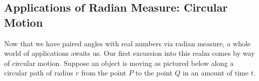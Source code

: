 \documentclass{ximera}
\begin{document}
\begin{example}
\begin{explanation}
\begin{enumerate}
\begin{image}

\end{image}

\end{enumerate}

\end{explanation}

\end{example}

\subsection{Applications of Radian Measure:  Circular Motion}
\label{circularmotion}

Now that we have paired angles with real numbers via radian measure, a whole world of applications awaits us.  Our first excursion into this realm comes by way of circular motion.  Suppose an object is moving as pictured below along a circular path of radius $r$ from the point $P$ to the point $Q$ in an amount of time $t$.  
 
\end{document}
